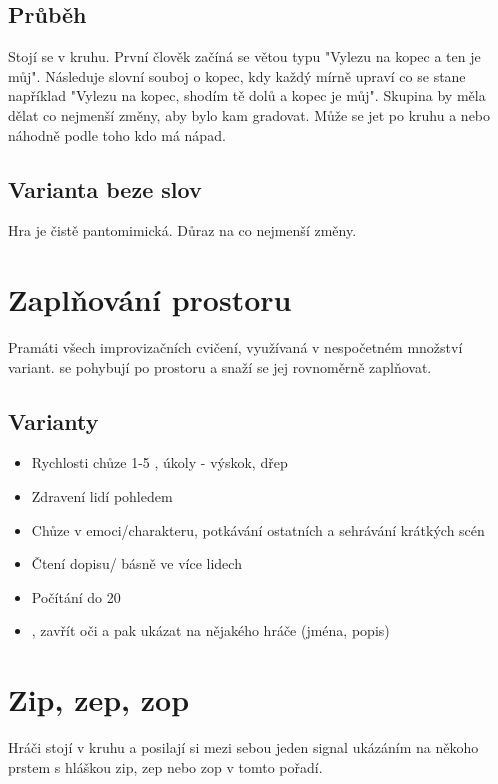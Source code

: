 \documentclass[main.tex]{subfiles}
\begin{document}
\subsection{Průběh} Stojí se v kruhu. První člověk začíná se větou typu "Vylezu na kopec a ten je můj". Následuje slovní souboj o kopec, kdy každý mírně upraví co se stane například "Vylezu na kopec, shodím tě dolů a kopec je můj". Skupina by měla dělat co nejmenší změny, aby bylo kam gradovat. Může se jet po kruhu a nebo náhodně podle toho kdo má nápad.  
 
\subsection{Varianta beze slov} Hra je čistě pantomimická. Důraz na co nejmenší změny. 
 
 
 
 
 
\needspace{5cm} \section{Zaplňování prostoru} \label{zaplňování prostoru} Pramáti všech improvizačních cvičení, využívaná v nespočetném množství variant.  se pohybují po prostoru a snaží se jej rovnoměrně zaplňovat. 
 
\subsection{Varianty} \begin{itemize}
\item Rychlosti chůze  1-5 , úkoly - výskok, dřep
\item Zdravení lidí pohledem
\item Chůze v emoci/charakteru, potkávání ostatních a sehrávání krátkých scén
\item Čtení dopisu/ básně ve více lidech
\item Počítání do 20
\item {}, zavřít oči a pak ukázat na nějakého hráče (jména, popis)
\end{itemize}
 
 
 
\needspace{5cm} \section{Zip, zep, zop} \label{zip, zep, zop} Hráči stojí v kruhu a posilají si mezi sebou jeden signal ukázáním na někoho prstem s hláškou zip, zep nebo zop v tomto pořadí. 
 
\end{document}
